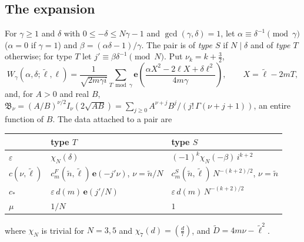 \documentclass[11pt]{amsart}
\numberwithin{equation}{section}
\theoremstyle{plain}
\theoremstyle{definition}
\theoremstyle{remark}
\newcommand{\e}{\mathbf{e}}
\begin{document}
\subsection{The expansion}
For $\gamma\ge1$ and $\delta$ with $0\le-\delta\le N\gamma-1$ and $\gcd(\gamma,\delta)=1$, let $\alpha\equiv\delta^{-1}\pmod\gamma$ ($\alpha=0$ if $\gamma=1$) and $\beta=(\alpha\delta-1)/\gamma$. The pair is of \emph{type $S$} if $N\mid\delta$ and of \emph{type $T$} otherwise; for type $T$ let $j'\equiv\beta\delta^{-1}\pmod N$. Put $\nu_k=k+\frac32$,
\[
W_{\gamma}(\alpha,\delta;\tilde\ell,\ell)=\frac{1}{\sqrt{2m\gamma i}}\sum_{T\bmod\gamma}\e\!\left(\frac{\alpha X^2-2\ell X+\delta\ell^2}{4m\gamma}\right),\qquad X=\tilde\ell-2mT,
\]
and, for $A>0$ and real $B$, $\mathfrak B_\nu=(A/B)^{\nu/2}I_\nu(2\sqrt{AB})=\sum_{j\ge0}A^{\nu+j}B^j/(j!\,\Gamma(\nu+j+1))$, an entire function of $B$. The data attached to a pair are
\begin{center}
\begin{tabular}{lll}
\toprule
&type $T$&type $S$\\
\midrule
$\varepsilon$&$\chi_N(\delta)$&$(-1)^k\chi_N(-\beta)\,i^{k+2}$\\
$c(\nu,\tilde\ell)$&$c^F_m(\tilde n,\tilde\ell)\,\e(-j'\nu)$, $\nu=\tilde n/N$&$c^S_m(\tilde n,\tilde\ell)\,N^{-(k+2)/2}$, $\nu=\tilde n$\\
$c_*$&$\varepsilon\,d(m)\,\e(j'/N)$&$\varepsilon\,d(m)\,N^{-(k+2)/2}$\\
$\mu$&$1/N$&$1$\\
\bottomrule
\end{tabular}
\end{center}
where $\chi_N$ is trivial for $N=3,5$ and $\chi_7(d)=(\frac d7)$, and $\tilde D=4m\nu-\tilde\ell^2$.
\end{document}
